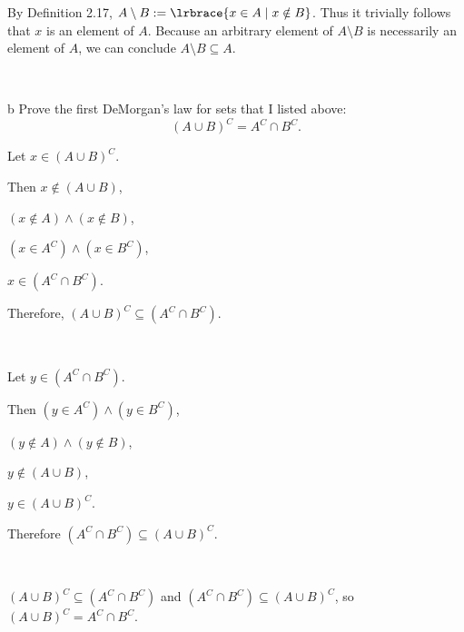 \documentclass{article}
\begin{document}


By Definition 2.17, $A \setminus B := \lrbrace{x \in A \mid x \notin B}$. Thus it trivially follows that $x$ is an element of $A$. Because an arbitrary element of $A \setminus B$ is necessarily an element of $A$, we can conclude $A \setminus B \subseteq A$. 



\

\begin{problem} b
Prove the first DeMorgan's law for sets that I listed above: \[(A\cup B)^C = A^C \cap B^C.\]
\end{problem}

Let $x \in (A \cup B)^C$. 

Then $x \notin (A \cup B)$,

$(x \notin A) \land (x \notin B)$,

$(x \in A^C) \land (x \in B^C)$,

$x \in (A^C \cap B^C)$.

Therefore, $(A \cup B)^C \subseteq (A^C \cap B^C)$.

\

Let $y \in (A^C \cap B^C)$.

Then $(y \in A^C) \land (y \in B^C)$,

$(y \notin A) \land (y \notin B)$,

$y \notin (A \cup B)$,

$y \in (A \cup B)^C$.

Therefore $(A^C \cap B^C) \subseteq (A\cup B)^C$.

\

$(A \cup B)^C \subseteq (A^C \cap B^C)$ and $(A^C \cap B^C) \subseteq (A\cup B)^C$, so $(A\cup B)^C = A^C \cap B^C$.

\
\hline
\section{}
\end{document}
